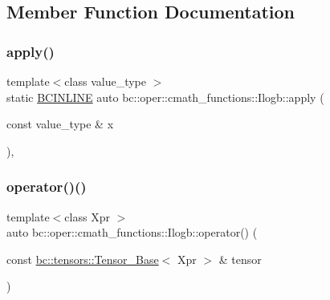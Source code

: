 \subsection{Member Function Documentation}
\mbox{\label{structbc_1_1oper_1_1cmath__functions_1_1Ilogb_a16529d8d6cba575c1d87d1f3f3ffec40}} 
\subsubsection{\texorpdfstring{apply()}{apply()}}
{\footnotesize\ttfamily template$<$class value\+\_\+type $>$ \\
static \hyperlink{common_8h_a6699e8b0449da5c0fafb878e59c1d4b1}{B\+C\+I\+N\+L\+I\+NE} auto bc\+::oper\+::cmath\+\_\+functions\+::\+Ilogb\+::apply (\begin{DoxyParamCaption}\item[{const value\+\_\+type \&}]{x }\end{DoxyParamCaption})\hspace{0.3cm}{\ttfamily [inline]}, {\ttfamily [static]}}

\mbox{\label{structbc_1_1oper_1_1cmath__functions_1_1Ilogb_a0623495e2121f786fc57146e03fc034b}} 
\subsubsection{\texorpdfstring{operator()()}{operator()()}\hspace{0.1cm}{\footnotesize\ttfamily [1/3]}}
{\footnotesize\ttfamily template$<$class Xpr $>$ \\
auto bc\+::oper\+::cmath\+\_\+functions\+::\+Ilogb\+::operator() (\begin{DoxyParamCaption}\item[{const \hyperlink{classbc_1_1tensors_1_1Tensor__Base}{bc\+::tensors\+::\+Tensor\+\_\+\+Base}$<$ Xpr $>$ \&}]{tensor }\end{DoxyParamCaption})\hspace{0.3cm}{\ttfamily [inline]}}

